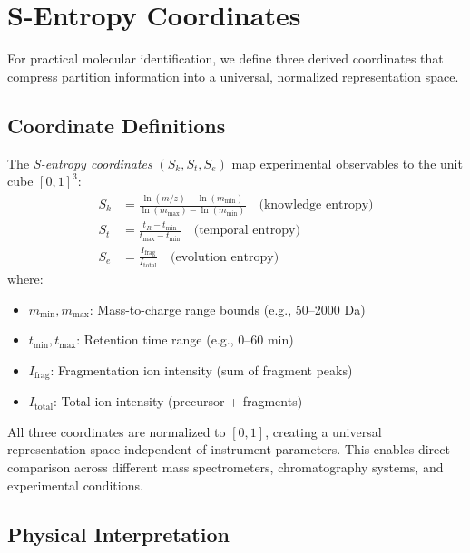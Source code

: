 \section{S-Entropy Coordinates}
\label{sec:sentropy}

For practical molecular identification, we define three derived coordinates that compress partition information into a universal, normalized representation space.

\subsection{Coordinate Definitions}

\begin{definition}
\label{def:sentropy}
The \emph{S-entropy coordinates} $(S_k, S_t, S_e)$ map experimental observables to the unit cube $[0,1]^3$:
\begin{align}
S_k &= \frac{\ln(m/z) - \ln(m_{\min})}{\ln(m_{\max}) - \ln(m_{\min})} \quad \text{(knowledge entropy)} \\
S_t &= \frac{t_R - t_{\min}}{t_{\max} - t_{\min}} \quad \text{(temporal entropy)} \\
S_e &= \frac{I_{\mathrm{frag}}}{I_{\mathrm{total}}} \quad \text{(evolution entropy)}
\end{align}
where:
\begin{itemize}
    \item $m_{\min}, m_{\max}$: Mass-to-charge range bounds (e.g., 50–2000 Da)
    \item $t_{\min}, t_{\max}$: Retention time range (e.g., 0–60 min)
    \item $I_{\mathrm{frag}}$: Fragmentation ion intensity (sum of fragment peaks)
    \item $I_{\mathrm{total}}$: Total ion intensity (precursor + fragments)
\end{itemize}
\end{definition}

\begin{remark}[Normalization]
All three coordinates are normalized to $[0, 1]$, creating a universal representation space independent of instrument parameters. This enables direct comparison across different mass spectrometers, chromatography systems, and experimental conditions.
\end{remark}

\subsection{Physical Interpretation}

